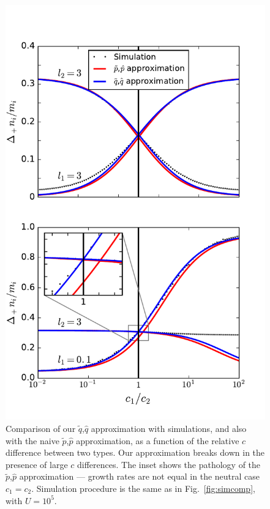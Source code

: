 \documentclass[12pt]{article}
\begin{document}
\begin{figure}
\centering
\includegraphics[scale=0.8]{approx_details.pdf}
\caption{\label{fig:approx_details} Comparison of our $\tilde{q}$,$\hat{q}$ approximation with simulations, and also with the naive $\tilde{p}$,$\hat{p}$ approximation, as a function of the relative $c$ difference between two types. Our approximation breaks down in the presence of large $c$ differences. The inset shows the pathology of the $\tilde{p}$,$\hat{p}$ approximation --- growth rates are not equal in the neutral case $c_1=c_2$. Simulation procedure is the same as in Fig.~\ref{fig:simcomp}, with $U=10^5$.}
\end{figure}
\end{document}
